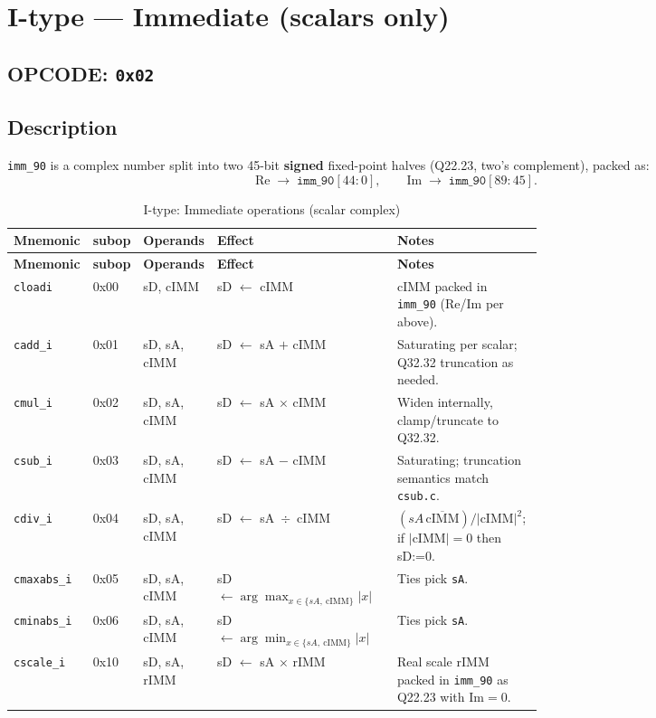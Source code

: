 \documentclass[10pt]{article}
\begin{document}
\section*{I-type — Immediate (scalars only)}
\subsection*{OPCODE: \texttt{0x02}}
\subsection*{Description}
\noindent \texttt{imm\_90} is a complex number split into two 45-bit \textbf{signed} fixed-point halves (Q22.23, two’s complement), packed as:
\[
\text{Re} \;\to\; \texttt{imm\_90}[44{:}0], \qquad
\text{Im} \;\to\; \texttt{imm\_90}[89{:}45].
\]

\begin{longtable}{@{}l l l L{0.38\linewidth} L{0.30\linewidth}@{}}
\caption{I-type: Immediate operations (scalar complex)}\label{tab:itype}\\
\toprule
\textbf{Mnemonic} & \textbf{subop} & \textbf{Operands} & \textbf{Effect} & \textbf{Notes} \\
\midrule
\endfirsthead
\toprule
\textbf{Mnemonic} & \textbf{subop} & \textbf{Operands} & \textbf{Effect} & \textbf{Notes} \\
\midrule
\endhead
\texttt{cloadi}   & 0x00 & sD, cIMM       & sD $\leftarrow$ cIMM
  & cIMM packed in \texttt{imm\_90} (Re/Im per above). \\

\texttt{cadd\_i}  & 0x01 & sD, sA, cIMM   & sD $\leftarrow$ sA $+$ cIMM
  & Saturating per scalar; Q32.32 truncation as needed. \\

\texttt{cmul\_i}  & 0x02 & sD, sA, cIMM   & sD $\leftarrow$ sA $\times$ cIMM
  & Widen internally, clamp/truncate to Q32.32. \\

\texttt{csub\_i}  & 0x03 & sD, sA, cIMM   & sD $\leftarrow$ sA $-$ cIMM
  & Saturating; truncation semantics match \texttt{csub.c}. \\

\texttt{cdiv\_i}  & 0x04 & sD, sA, cIMM   & sD $\leftarrow$ sA \,$\div$\, cIMM
  & $(sA\,\overline{\text{cIMM}})/|\text{cIMM}|^2$; if $|\text{cIMM}|{=}0$ then sD:=0. \\

\texttt{cmaxabs\_i} & 0x05 & sD, sA, cIMM & sD $\leftarrow \arg\max_{x\in\{sA,\ \text{cIMM}\}} |x|$
  & Ties pick \texttt{sA}. \\

\texttt{cminabs\_i} & 0x06 & sD, sA, cIMM & sD $\leftarrow \arg\min_{x\in\{sA,\ \text{cIMM}\}} |x|$
  & Ties pick \texttt{sA}. \\

\texttt{cscale\_i} & 0x10 & sD, sA, rIMM  & sD $\leftarrow$ sA $\times$ rIMM
  & Real scale rIMM packed in \texttt{imm\_90} as Q22.23 with $\mathrm{Im}{=}0$. \\

\bottomrule
\end{longtable}
\end{document}
